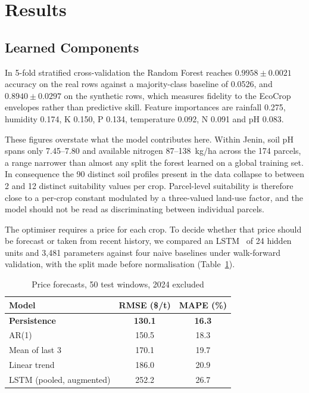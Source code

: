 \documentclass[conference,a4paper]{IEEEtran}
\begin{document}


\section{Results}
\label{sec:results}

\subsection{Learned Components}

In 5-fold stratified cross-validation the Random Forest reaches
$0.9958\pm0.0021$ accuracy on the real rows against a majority-class baseline
of 0.0526, and $0.8940\pm0.0297$ on the synthetic rows, which measures
fidelity to the EcoCrop envelopes rather than predictive skill. Feature
importances are rainfall 0.275, humidity 0.174, K 0.150, P 0.134, temperature
0.092, N 0.091 and pH 0.083.

These figures overstate what the model contributes here. Within Jenin, soil pH
spans only 7.45--7.80 and available nitrogen 87--138~kg/ha across the 174
parcels, a range narrower than almost any split the forest learned on a global
training set. In consequence the 90 distinct soil profiles present in the data
collapse to between 2 and 12 distinct suitability values per crop. Parcel-level
suitability is therefore close to a per-crop constant modulated by a
three-valued land-use factor, and the model should not be read as
discriminating between individual parcels.

The optimiser requires a price for each crop. To decide whether that price
should be forecast or taken from recent history, we compared an
LSTM~\cite{hochreiter1997} of 24 hidden units and 3{,}481 parameters against
four naive baselines under walk-forward validation, with the split made before
normalisation (Table~\ref{tab:lstm}).

\begin{table}[t]
\centering
\caption{Price forecasts, 50 test windows, 2024 excluded}
\label{tab:lstm}
\footnotesize
\begin{tabular}{lcc}
\toprule
Model & RMSE (\$/t) & MAPE (\%) \\
\midrule
\textbf{Persistence} & \textbf{130.1} & \textbf{16.3} \\
AR(1) & 150.5 & 18.3 \\
Mean of last 3 & 170.1 & 19.7 \\
Linear trend & 186.0 & 20.9 \\
LSTM (pooled, augmented) & 252.2 & 26.7 \\
\bottomrule
\end{tabular}
\end{table}
\end{document}
